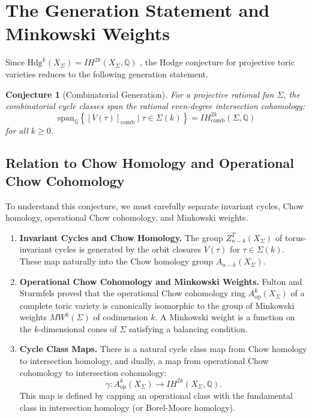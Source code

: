\documentclass[12pt,reqno]{amsart}
\theoremstyle{plain}
\newtheorem{conjecture}{Conjecture}[section]
\theoremstyle{definition}
\newcommand{\IQ}{\mathbb{Q}}
\newcommand{\SigmaFan}{\Sigma}
\newcommand{\IHcomb}{IH_{\mathrm{comb}}}
\newcommand{\Hdg}{\mathrm{Hdg}}
\newcommand{\Chowh}[1]{A_{#1}}
\newcommand{\Chowop}[1]{A^{#1}_{\mathrm{op}}}
\begin{document}
	\section{The Generation Statement and Minkowski Weights}
	
	Since $\Hdg^k(X_{\SigmaFan}) = IH^{2k}(X_{\SigmaFan}, \IQ)$ \cite{Fieseler91}, the Hodge conjecture for projective toric varieties reduces to the following generation statement.
	
	\begin{conjecture}[Combinatorial Generation]
		\label{conj:generation}
		For a projective rational fan $\SigmaFan$, the combinatorial cycle classes span the rational even-degree intersection cohomology:
		\[
		\mathrm{span}_{\IQ}\left\{ [V(\tau)]_{\mathrm{comb}} \mid \tau \in \SigmaFan(k) \right\} = \IHcomb^{2k}(\SigmaFan, \IQ)
		\]
		for all $k \ge 0$.
	\end{conjecture}
	
	\subsection{Relation to Chow Homology and Operational Chow Cohomology}
	
	To understand this conjecture, we must carefully separate invariant cycles, Chow homology, operational Chow cohomology, and Minkowski weights.
	
	\begin{enumerate}
		\item \textbf{Invariant Cycles and Chow Homology.} The group $Z_{n-k}^T(X_\SigmaFan)$ of torus-invariant cycles is generated by the orbit closures $V(\tau)$ for $\tau \in \SigmaFan(k)$. These map naturally into the Chow homology group $\Chowh{n-k}(X_\SigmaFan)$.
		
		\item \textbf{Operational Chow Cohomology and Minkowski Weights.} Fulton and Sturmfels \cite{FS97} proved that the operational Chow cohomology ring $\Chowop{k}(X_\SigmaFan)$ of a complete toric variety is canonically isomorphic to the group of Minkowski weights $MW^k(\SigmaFan)$ of codimension $k$. A Minkowski weight is a function on the $k$-dimensional cones of $\SigmaFan$ satisfying a balancing condition.
		
		\item \textbf{Cycle Class Maps.} There is a natural cycle class map from Chow homology to intersection homology, and dually, a map from operational Chow cohomology to intersection cohomology:
		\[
		\gamma: \Chowop{k}(X_\SigmaFan) \to IH^{2k}(X_\SigmaFan, \IQ).
		\]
		This map is defined by capping an operational class with the fundamental class in intersection homology (or Borel-Moore homology).
	\end{enumerate}
	
\end{document}
